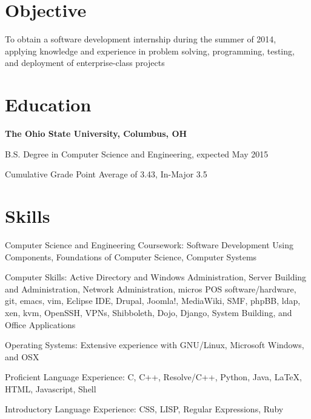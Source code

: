 \documentclass[letterpaper]{resume}
\begin{document}
\author{Christopher John Wallace}
\maketitle

\section{Objective}
\begin{compactitem}
\item
	To obtain a software development internship during the summer of 2014, applying
	knowledge and experience in problem solving, programming, testing, and
	deployment of enterprise-class projects
\end{compactitem}

\section{Education}
\textbf{The Ohio State University, Columbus, OH}

\begin{compactitem}
\item B.S. Degree in Computer Science and Engineering, expected May 2015
\item Cumulative Grade Point Average of 3.43, In-Major 3.5
\end{compactitem}

\section{Skills}

\begin{compactitem}
\item Computer Science and Engineering Coursework:
	Software Development Using Components, Foundations of Computer Science,
	Computer Systems

\item Computer Skills: Active Directory and Windows Administration,
	Server Building and Administration, Network Administration,
	micros POS software/hardware, git, emacs, vim, Eclipse IDE, Drupal,
	Joomla!, MediaWiki, SMF, phpBB, ldap, xen, kvm, OpenSSH, VPNs,
	Shibboleth, Dojo, Django, System Building, and Office Applications

\item Operating Systems: Extensive experience with GNU/Linux,
	Microsoft Windows, and OSX

\item Proficient Language Experience: C, C++, Resolve/C++, Python, Java,
	\LaTeX, HTML, Javascript, Shell
\item Introductory Language Experience: CSS, LISP, Regular Expressions, Ruby

\end{compactitem}
\end{document}
